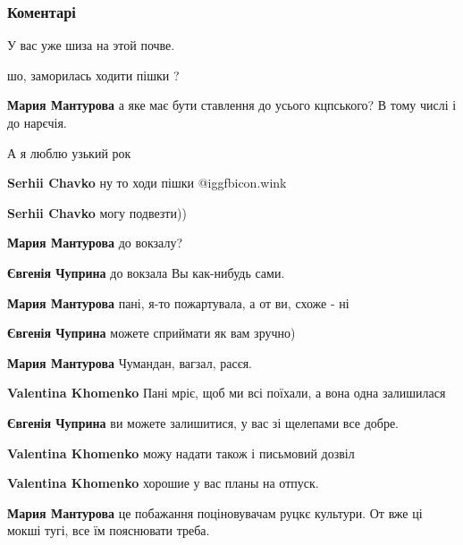  
 
 
 
 
\subsubsection{Коментарі}
\label{sec:14_10_2021.fb.fb_group.ukrainskij_rok.1.uzkij_rok.cmt}

\begin{itemize} %
У вас уже шиза на этой почве.

\begin{itemize} %
шо, заморилась ходити пішки ?

\textbf{Мария Мантурова} а яке має бути ставлення до усього кцпського? В тому числі і до нарєчія.
\end{itemize} %

А я люблю узький рок

\begin{itemize} %
\textbf{Serhii Chavko} ну то ходи пішки  @igg{fbicon.wink} 

\textbf{Serhii Chavko} могу подвезти))

\begin{itemize} %
\textbf{Мария Мантурова} до вокзалу?

\textbf{Євгенія Чуприна} до вокзала Вы как-нибудь сами.

\textbf{Мария Мантурова} пані, я-то пожартувала, а от ви, схоже - ні

\textbf{Євгенія Чуприна} можете сприймати як вам зручно)

\textbf{Мария Мантурова} Чумандан, вагзал, расєя.

\textbf{Valentina Khomenko} Пані мріє, щоб ми всі поїхали, а вона одна залишилася

\textbf{Євгенія Чуприна} ви можете залишитися, у вас зі щелепами все добре.

\textbf{Valentina Khomenko} можу надати також і письмовий дозвіл
\end{itemize} %

\textbf{Valentina Khomenko} хорошие у вас планы на отпуск.

\begin{itemize} %
\textbf{Мария Мантурова} це побажання поціновувачам руцкє культури. От вже ці мокші тугі, все їм пояснювати треба.
\end{itemize} %

\end{itemize} %

\end{itemize} %
